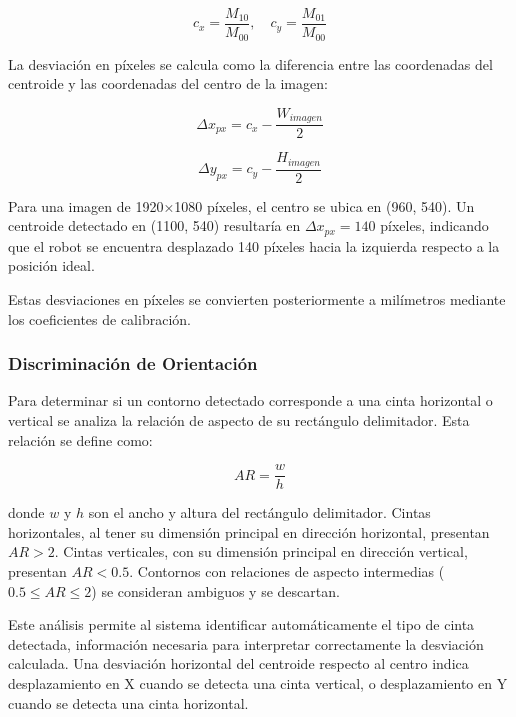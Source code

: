 \begin{equation}
c_x = \frac{M_{10}}{M_{00}}, \quad c_y = \frac{M_{01}}{M_{00}}
\end{equation}

La desviación en píxeles se calcula como la diferencia entre las coordenadas del centroide y las coordenadas del centro de la imagen:

\begin{equation}
\Delta x_{px} = c_x - \frac{W_{imagen}}{2}
\end{equation}

\begin{equation}
\Delta y_{px} = c_y - \frac{H_{imagen}}{2}
\end{equation}

Para una imagen de 1920×1080 píxeles, el centro se ubica en (960, 540). Un centroide detectado en (1100, 540) resultaría en $\Delta x_{px} = 140$ píxeles, indicando que el robot se encuentra desplazado 140 píxeles hacia la izquierda respecto a la posición ideal.

Estas desviaciones en píxeles se convierten posteriormente a milímetros mediante los coeficientes de calibración.

\subsubsection{Discriminación de Orientación}

Para determinar si un contorno detectado corresponde a una cinta horizontal o vertical se analiza la relación de aspecto de su rectángulo delimitador. Esta relación se define como:

\begin{equation}
AR = \frac{w}{h}
\end{equation}

donde $w$ y $h$ son el ancho y altura del rectángulo delimitador. Cintas horizontales, al tener su dimensión principal en dirección horizontal, presentan $AR > 2$. Cintas verticales, con su dimensión principal en dirección vertical, presentan $AR < 0.5$. Contornos con relaciones de aspecto intermedias ($0.5 \leq AR \leq 2$) se consideran ambiguos y se descartan.

Este análisis permite al sistema identificar automáticamente el tipo de cinta detectada, información necesaria para interpretar correctamente la desviación calculada. Una desviación horizontal del centroide respecto al centro indica desplazamiento en X cuando se detecta una cinta vertical, o desplazamiento en Y cuando se detecta una cinta horizontal.
